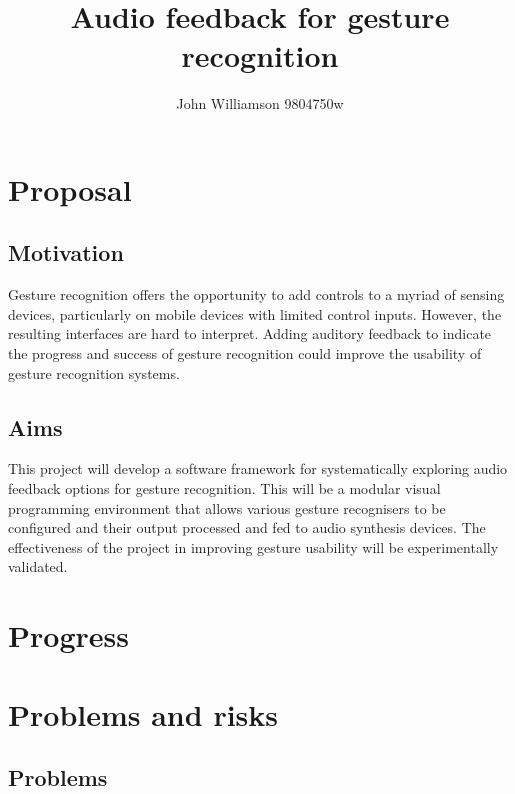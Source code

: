 \documentclass[11pt]{article}
\title{Audio feedback for gesture recognition}
\author{John Williamson 9804750w}
\begin{document}
    \maketitle
    
    
     



\section{Proposal}\label{proposal}

\subsection{Motivation}\label{motivation}

Gesture recognition offers the opportunity to add controls to a myriad of sensing
devices, particularly on mobile devices with limited control inputs. However, the
resulting interfaces are hard to interpret. Adding auditory feedback to indicate
the progress and success of gesture recognition could improve the usability of
gesture recognition systems.


\subsection{Aims}\label{aims}

This project will develop a software framework for systematically exploring
audio feedback options for gesture recognition. This will be a modular visual
programming environment that allows various gesture recognisers to be configured
and their output processed and fed to audio synthesis devices. The effectiveness
of the project in improving gesture usability will be experimentally validated.

\section{Progress}\label{progress}

\begin{itemize}
    \tightlist
    
\end{itemize}

\section{Problems and risks}\label{problems-and-risks}

\subsection{Problems}\label{problems}
\end{document}
